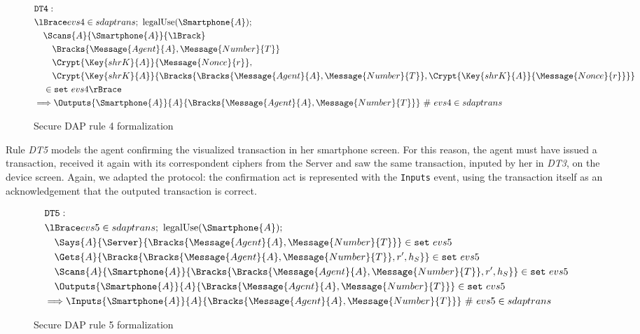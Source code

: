 \begin{figure}[!h]
  \begin{align*}
    & \texttt{DT4}: \newline \\
    & \lBrace evs4 \in sdaptrans;\ \text{legalUse}(\Smartphone{A}); \\
    & \quad \Scans{A}{\Smartphone{A}}{\lBrack} \\
    & \qquad \Bracks{\Message{Agent}{A}, \Message{Number}{T}} \\
    & \qquad \Crypt{\Key{shrK}{A}}{\Message{Nonce}{r}}, \\
    & \qquad \Crypt{\Key{shrK}{A}}{\Bracks{\Bracks{\Message{Agent}{A}, \Message{Number}{T}}, \Crypt{\Key{shrK}{A}}{\Message{Nonce}{r}}}} \\
    & \quad \in \texttt{set} \ evs4 \rBrace \\
    & \Longrightarrow \Outputs{\Smartphone{A}}{A}{\Bracks{\Message{Agent}{A}, \Message{Number}{T}}} \ \# \ evs4 \in sdaptrans
  \end{align*}
  \label{fig:dap-model-4}
  \caption{Secure DAP rule 4 formalization}
\end{figure}

Rule \textit{DT5} models the agent confirming the visualized transaction in her smartphone screen. For this reason, the agent must have issued a transaction, received it again with its correspondent ciphers from the Server and saw the same transaction, inputed by her in \textit{DT3}, on the device screen. Again, we adapted the protocol: the confirmation act is represented with the \texttt{Inputs} event, using the transaction itself as an acknowledgement that the outputed transaction is correct.

\begin{figure}[!h]
  \begin{align*}
    & \texttt{DT5}: \newline \\
    & \lBrace evs5 \in sdaptrans;\ \text{legalUse}(\Smartphone{A}); \\
    & \quad \Says{A}{\Server}{\Bracks{\Message{Agent}{A}, \Message{Number}{T}}} \in \texttt{set} \ evs5 \\
    & \quad \Gets{A}{\Bracks{\Bracks{\Message{Agent}{A}, \Message{Number}{T}}, r', h_S}} \in \texttt{set} \ evs5 \\
    & \quad \Scans{A}{\Smartphone{A}}{\Bracks{\Bracks{\Message{Agent}{A}, \Message{Number}{T}}, r', h_S}} \in \texttt{set} \ evs5 \\
    & \quad \Outputs{\Smartphone{A}}{A}{\Bracks{\Message{Agent}{A}, \Message{Number}{T}}} \in \texttt{set} \ evs5 \\
    & \Longrightarrow \Inputs{\Smartphone{A}}{A}{\Bracks{\Message{Agent}{A}, \Message{Number}{T}}} \ \# \ evs5 \in sdaptrans
  \end{align*}
  \label{fig:dap-model-5}
  \caption{Secure DAP rule 5 formalization}
\end{figure}

